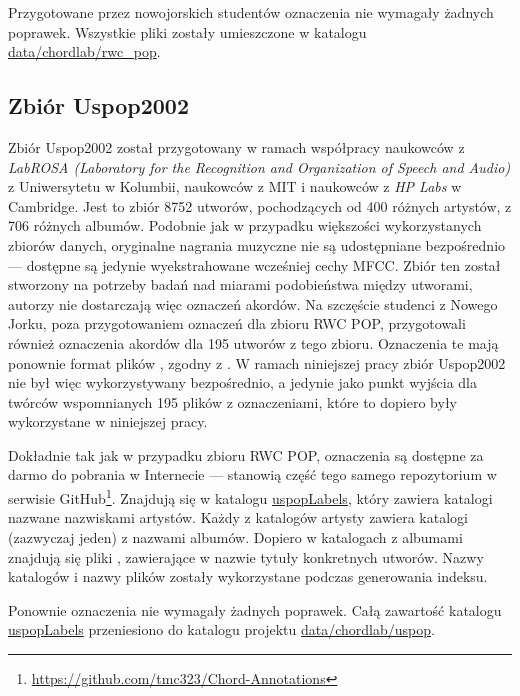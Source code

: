 Przygotowane przez nowojorskich studentów oznaczenia nie wymagały żadnych poprawek. Wszystkie pliki  zostały umieszczone w katalogu \url{data/chordlab/rwc_pop}.

\subsection{Zbiór Uspop2002}

Zbiór Uspop2002 \cite{berenzweig_large-scale_2004} został przygotowany w ramach współpracy naukowców z \emph{LabROSA (Laboratory for the Recognition and Organization of Speech and Audio)} z Uniwersytetu w Kolumbii, naukowców z MIT i naukowców z \emph{HP Labs} w Cambridge. Jest to zbiór 8752 utworów, pochodzących od 400 różnych artystów, z 706 różnych albumów. Podobnie jak w przypadku większości wykorzystanych zbiorów danych, oryginalne nagrania muzyczne nie są udostępniane bezpośrednio --- dostępne są jedynie wyekstrahowane wcześniej cechy MFCC. Zbiór ten został stworzony na potrzeby badań nad miarami podobieństwa między utworami, autorzy nie dostarczają więc oznaczeń akordów. Na szczęście studenci z Nowego Jorku, poza przygotowaniem oznaczeń dla zbioru RWC POP, przygotowali również oznaczenia akordów dla 195 utworów z tego zbioru. Oznaczenia te mają ponownie format plików , zgodny z \cite{harte_towards_nodate}. W ramach niniejszej pracy zbiór Uspop2002 nie był więc wykorzystywany bezpośrednio, a jedynie jako punkt wyjścia dla twórców wspomnianych 195 plików z oznaczeniami, które to dopiero były wykorzystane w niniejszej pracy.

Dokładnie tak jak w przypadku zbioru RWC POP, oznaczenia są dostępne za darmo do pobrania w Internecie --- stanowią część tego samego repozytorium w serwisie GitHub\footnote{\url{https://github.com/tmc323/Chord-Annotations}}. Znajdują się w katalogu \url{uspopLabels}, który zawiera katalogi nazwane nazwiskami artystów. Każdy z katalogów artysty zawiera katalogi (zazwyczaj jeden) z nazwami albumów. Dopiero w katalogach z albumami znajdują się pliki , zawierające w nazwie tytuły konkretnych utworów. Nazwy katalogów i nazwy plików zostały wykorzystane podczas generowania indeksu.

Ponownie oznaczenia nie wymagały żadnych poprawek. Całą zawartość katalogu \url{uspopLabels} przeniesiono do katalogu projektu \url{data/chordlab/uspop}.

